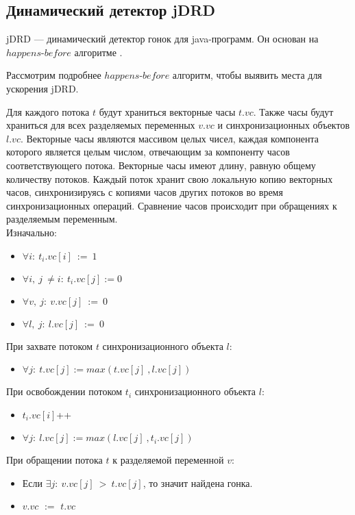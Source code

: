\subsection{Динамический детектор jDRD}
jDRD --- динамический детектор гонок для java-программ. Он основан на $happens$-$before$ алгоритме \cite{DRD}. 

Рассмотрим подробнее $happens$-$before$ алгоритм, чтобы выявить места для ускорения jDRD.

Для каждого потока $t$ будут храниться векторные часы $t.vc$. Также часы будут храниться для всех разделяемых переменных $v.vc$ и синхронизационных объектов $l.vc$.
Векторные часы являются массивом целых чисел, каждая компонента которого является целым числом, отвечающим за компоненту часов соответствующего потока. Векторные часы имеют длину, равную общему количеству потоков. Каждый поток хранит свою локальную копию векторных часов, синхронизируясь с копиями часов других потоков во время синхронизационных операций.
Сравнение часов происходит при обращениях к разделяемым переменным.
\\Изначально:  

\begin{itemize}
	\item $ \forall i:\ t_i.vc[i]\ :=\ 1$
	\item $ \forall i,\ j\ \neq i:\ t_i.vc[j] := 0$
	\item $ \forall v,\ j:\  v.vc[j]\ :=\ 0$
	\item $ \forall l,\ j:\  l.vc[j]\ :=\ 0$
\end{itemize}
При захвате потоком $t$ синхронизационного объекта $l$: 

\begin{itemize}
	\item $ \forall j:\ t.vc[j] := max(t.vc[j]\ , l.vc[j])$
\end{itemize}
При освобождении потоком $t_i$ синхронизационного объекта $l$: 

\begin{itemize}
	\item $t_i.vc[i]$++
	\item $ \forall j:\ l.vc[j] := max(l.vc[j]\ , t_i.vc[j])$
\end{itemize}
При обращении потока $t$ к разделяемой переменной $v$: 
\begin{itemize}
	\item Если $ \exists j:\ v.vc[j]\ >\ t.vc[j]$, то значит найдена гонка. 
	\item $v.vc$ $:=$ $t.vc$
\end{itemize}



